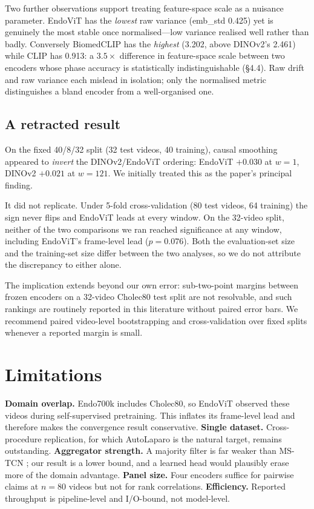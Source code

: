 \documentclass[10pt,twocolumn]{article}
\begin{document}
Two further observations support treating feature-space scale as a nuisance
parameter. EndoViT has the \emph{lowest} raw variance (emb\_std 0.425) yet is
genuinely the most stable once normalised---low variance realised well rather
than badly. Conversely BiomedCLIP has the \emph{highest} (3.202, above DINOv2's
2.461) while CLIP has 0.913: a $3.5\times$ difference in feature-space scale
between two encoders whose phase accuracy is statistically indistinguishable
(\S4.4). Raw drift and raw variance each mislead in isolation; only the
normalised metric distinguishes a bland encoder from a well-organised one.

\subsection{A retracted result}
\label{sec:retraction}
On the fixed 40/8/32 split (32 test videos, 40 training), causal smoothing
appeared to \emph{invert} the DINOv2/EndoViT ordering: EndoViT $+0.030$ at
$w=1$, DINOv2 $+0.021$ at $w=121$. We initially treated this as the paper's
principal finding.

It did not replicate. Under 5-fold cross-validation (80 test videos, 64
training) the sign never flips and EndoViT leads at every window. On the 32-video split, neither of the two comparisons we ran reached
significance at any window, including EndoViT's frame-level lead
($p=0.076$). Both the evaluation-set size
and the training-set size differ between the two analyses, so we do not
attribute the discrepancy to either alone.

The implication extends beyond our own error: sub-two-point margins between
frozen encoders on a 32-video Cholec80 test split are not resolvable, and such
rankings are routinely reported in this literature without paired error bars.
We recommend paired video-level bootstrapping and cross-validation over fixed
splits whenever a reported margin is small.

\section{Limitations}
\label{sec:limits}
\textbf{Domain overlap.} Endo700k includes Cholec80, so EndoViT observed these
videos during self-supervised pretraining. This inflates its frame-level lead
and therefore makes the convergence result conservative. \textbf{Single
dataset.} Cross-procedure replication, for which AutoLaparo
\citep{wang2022autolaparo} is the natural target, remains outstanding.
\textbf{Aggregator strength.} A majority filter is far weaker than MS-TCN
\citep{farha2019mstcn}; our result is a lower bound, and a learned head would
plausibly erase more of the domain advantage. \textbf{Panel size.} Four
encoders suffice for pairwise claims at $n=80$ videos but not for rank
correlations. \textbf{Efficiency.} Reported throughput is pipeline-level and
I/O-bound, not model-level.
\end{document}
